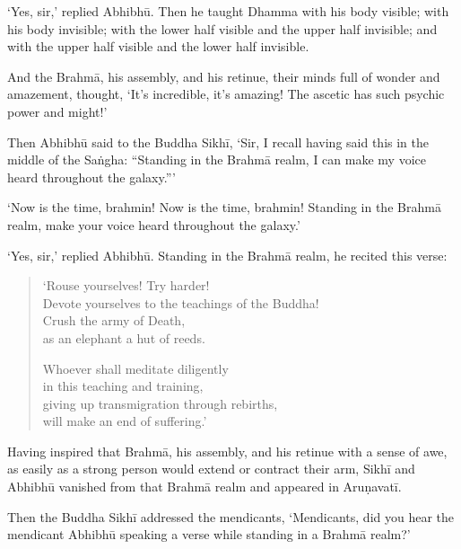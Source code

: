 \documentclass[12pt,openany]{book}%
\begin{document}
‘Yes, sir,’ replied \textsanskrit{Abhibhū}. Then he taught Dhamma with his body visible; with his body invisible; with the lower half visible and the upper half invisible; and with the upper half visible and the lower half invisible. 

And the \textsanskrit{Brahmā}, his assembly, and his retinue, their minds full of wonder and amazement, thought, ‘It’s incredible, it’s amazing! The ascetic has such psychic power and might!’ 

Then \textsanskrit{Abhibhū} said to the Buddha \textsanskrit{Sikhī}, ‘Sir, I recall having said this in the middle of the \textsanskrit{Saṅgha}: “Standing in the \textsanskrit{Brahmā} realm, I can make my voice heard throughout the galaxy.”’ 

‘Now is the time, brahmin! Now is the time, brahmin! Standing in the \textsanskrit{Brahmā} realm, make your voice heard throughout the galaxy.’ 

‘Yes, sir,’ replied \textsanskrit{Abhibhū}. Standing in the \textsanskrit{Brahmā} realm, he recited this verse: 

\begin{verse}%
‘Rouse yourselves! Try harder! \\
Devote yourselves to the teachings of the Buddha! \\
Crush the army of Death, \\
as an elephant a hut of reeds. 

Whoever shall meditate diligently \\
in this teaching and training, \\
giving up transmigration through rebirths, \\
will make an end of suffering.’ 

%
\end{verse}

Having inspired that \textsanskrit{Brahmā}, his assembly, and his retinue with a sense of awe, as easily as a strong person would extend or contract their arm, \textsanskrit{Sikhī} and \textsanskrit{Abhibhū} vanished from that \textsanskrit{Brahmā} realm and appeared in \textsanskrit{Aruṇavatī}. 

Then the Buddha \textsanskrit{Sikhī} addressed the mendicants, ‘Mendicants, did you hear the mendicant \textsanskrit{Abhibhū} speaking a verse while standing in a \textsanskrit{Brahmā} realm?’ 
\end{document}
